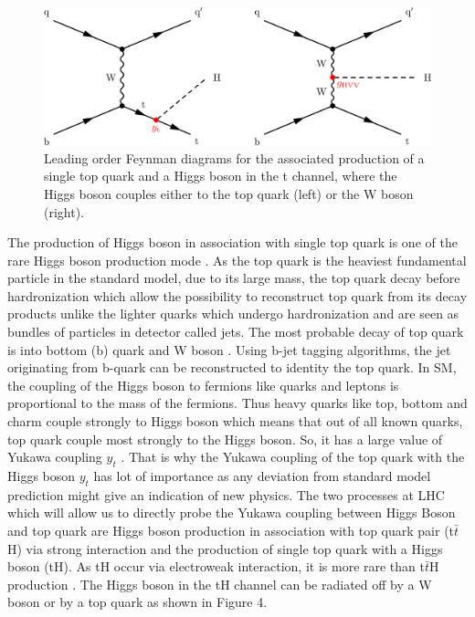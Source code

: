 \documentclass[final,3p]{CSP}
\begin{document}
\begin{figure}[ht]
	\centering
	\includegraphics[width=\columnwidth]{./cms.png}
	\caption{Leading order Feynman diagrams for the associated production of a single top quark and a Higgs boson in the t channel, where the Higgs boson couples either to the top quark (left) or the W boson (right).}
	\label{figure 4}
\end{figure}


The production of Higgs boson in association with single top quark is one of the rare Higgs 
boson production mode \cite{Khachatryan_2016}. As the top 
quark is the heaviest fundamental particle in the standard model, due to its large mass, the 
top quark decay before 
hardronization which allow the possibility to reconstruct top quark from its decay products 
unlike the lighter quarks which 
undergo hardronization and are seen as bundles of particles in detector called jets. The most 
probable decay of top quark is 
into bottom (b) quark and W boson \cite{nishiwaki2014tth}. Using b-jet tagging algorithms, the jet originating from 
b-quark can be reconstructed to 
identity the top quark. In SM, the coupling of the Higgs boson to fermions like quarks and 
leptons is proportional to the mass 
of the fermions. Thus heavy quarks like top, bottom and charm couple strongly to Higgs boson 
which means that out of all known 
quarks, top quark couple most strongly to the Higgs boson. So, it has a large value of Yukawa 
coupling $y_t$ \cite{Aad_2016}. That is why the 
Yukawa coupling of the top quark with the Higgs boson $y_t$ has lot of importance as any 
deviation from standard model prediction might give an indication of new physics. The two 
processes at LHC which will allow us to directly probe the Yukawa 
coupling between Higgs Boson and top quark are Higgs boson production in association with top 
quark pair (t$\bar{t}$H) via 
strong interaction and the production of single top quark with a Higgs boson (tH). As tH 
occur via electroweak interaction, it 
is more rare than t$\bar{t}$H production \cite{sirunyan2018search}. The Higgs boson in the tH channel can be radiated 
off by a W boson or by a top quark as shown in Figure 4.
\end{document}
